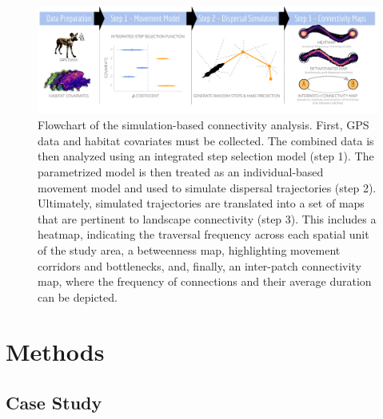 \documentclass[abstract=on,10pt,a4paper,bibliography=totocnumbered]{article}
\begin{document}
\begin{figure}[htbp]
  \begin{center}
    \includegraphics[width = \textwidth]{99_GraphicalAbstract.pdf}
    \caption{Flowchart of the simulation-based connectivity analysis. First, GPS
    data and habitat covariates must be collected. The combined data is then
    analyzed using an integrated step selection model (step 1). The parametrized
    model is then treated as an individual-based movement model and used to
    simulate dispersal trajectories (step 2). Ultimately, simulated trajectories
    are translated into a set of maps that are pertinent to landscape
    connectivity (step 3). This includes a heatmap, indicating the traversal
    frequency across each spatial unit of the study area, a betweenness map,
    highlighting movement corridors and bottlenecks, and, finally, an
    inter-patch connectivity map, where the frequency of connections and their
    average duration can be depicted.}
    \label{GraphicalAbstract}
  \end{center}
\end{figure}

\section{Methods}
\subsection{Case Study}
\end{document}
